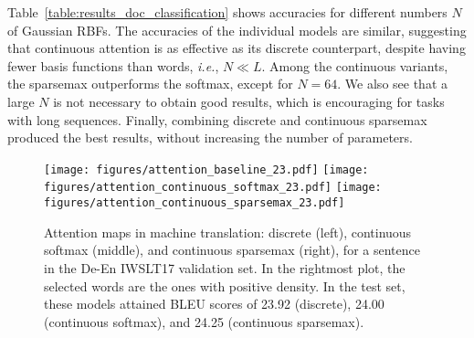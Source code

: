 \documentclass{article}
\begin{document}
\begin{table}[t]
\begin{scriptsize}
\begin{center}
\begin{comment}
        \toprule
        \sc Attention & $N=32$ & $N=64$ & $N=128$ \\
        \midrule 
        Discrete softmax    		& 90.78		& 90.78		& 90.78    	\\
        Discrete sparsemax	 		& 90.58		& 90.58		& 90.58   	\\
       \midrule
        Continuous softmax			& 90.20		& 90.68		& 90.52    	\\
        Continuous sparsemax	 	& 90.52		& 89.63		& 90.90   	\\
        Disc. + Cont. softmax		& 90.98		& 90.69		& 89.62   	\\
        Disc. + Cont. sparsemax	 	& \bf 91.10		& \bf 91.18		& \bf 90.98    	\\
        \bottomrule
    \end{tabular}
\end{comment}
\end{center}
    \end{scriptsize}
\end{table}

Table~\ref{table:results_doc_classification} 
shows accuracies for different numbers $N$ of Gaussian RBFs. The accuracies of the individual models are similar, suggesting that continuous attention is as effective as its discrete counterpart, despite having fewer basis functions than words, \textit{i.e.}, $N \ll L$. Among the continuous variants, the sparsemax outperforms the softmax, except for $N=64$. We also see that a large $N$ is not necessary to obtain good results, which is encouraging for tasks with long sequences. Finally, combining discrete and continuous sparsemax produced the best results, without increasing the number of parameters.




\begin{figure*}[t]
\centering
\texttt{[image: figures/attention\_baseline\_23.pdf]}
\texttt{[image: figures/attention\_continuous\_softmax\_23.pdf]}
\texttt{[image: figures/attention\_continuous\_sparsemax\_23.pdf]}
\caption{\label{fig:attention_maps}Attention maps in machine translation: discrete (left), continuous softmax (middle), and continuous sparsemax (right), for a sentence in the De-En IWSLT17 validation set. In the rightmost plot, the selected words are the ones with positive density. In the test set, these models attained BLEU scores of 23.92 (discrete), 24.00 (continuous softmax), and 24.25 (continuous sparsemax).}
\end{figure*}
\end{document}
